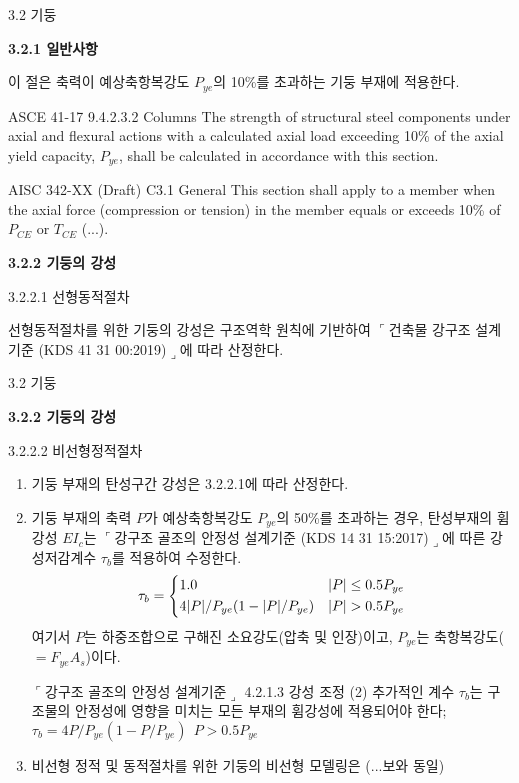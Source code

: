 \begin{frame}{3.2 기둥}

\textbf{3.2.1 일반사항}

이 절은 축력이 예상축항복강도 $P_{ye}$의 10\%를 초과하는 기둥 부재에 적용한다. 

\begin{block}{ASCE 41-17 9.4.2.3.2 Columns}
	The strength of structural steel components under axial and flexural actions with a calculated axial load exceeding 10\% of the axial yield capacity, $P_{ye}$, shall be calculated in accordance with this section.
\end{block}

\begin{block}{AISC 342-XX (Draft) C3.1 General}
	This section shall apply to a member when the axial force (compression or tension) in the member equals or exceeds 10\% of $P_{CE}$ or $T_{CE}$ (...).
\end{block}
\textbf{3.2.2 기둥의 강성}

3.2.2.1 선형동적절차

선형동적절차를 위한 기둥의 강성은 구조역학 원칙에 기반하여 $\ulcorner$건축물 강구조 설계기준 (KDS 41 31 00:2019)$\lrcorner$에 따라 산정한다. 

\end{frame}


\begin{frame}{3.2 기둥}

	\textbf{3.2.2 기둥의 강성}

3.2.2.2 비선형정적절차

\begin{enumerate}
	\item[(1)] 기둥 부재의 탄성구간 강성은 3.2.2.1에 따라 산정한다. 
	\item[(2)] 기둥 부재의 축력 $P$가 예상축항복강도 $P_{ye}$의 50\%를 초과하는 경우, 탄성부재의 휨강성 $EI_c$는 $\ulcorner$강구조 골조의 안정성 설계기준 (KDS 14 31 15:2017)$\lrcorner$에 따른 강성저감계수 $\tau_b$를 적용하여 수정한다. 
	\[\tau_b = \begin{dcases}1.0 & \vert P\vert \leq 0.5 P_{ye} \\ 4\vert P\vert/P_{ye}(1 - \vert P\vert/P_{ye}) & \vert P\vert > 0.5 P_{ye}\end{dcases}\]
	\noindent 여기서 $P$는 하중조합으로 구해진 소요강도(압축 및 인장)이고, $P_{ye}$는 축항복강도($=F_{ye}A_s$)이다. 
	\begin{block}{$\ulcorner$강구조 골조의 안정성 설계기준$\lrcorner$ 4.2.1.3 강성 조정}
(2) 추가적인 계수 $\tau_b$는 구조물의 안정성에 영향을 미치는 모든 부재의 휨강성에 적용되어야 한다; $\tau_b = 4 P/P_{ye}(1 - P/P_{ye})~~ P > 0.5 P_{ye}$
	\end{block}
	\item[(3)] 비선형 정적 및 동적절차를 위한 기둥의 비선형 모델링은 (...보와 동일)
\end{enumerate}
\end{frame}




